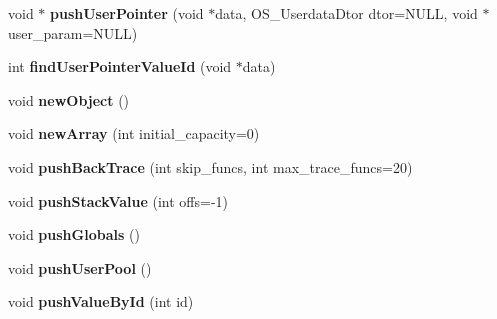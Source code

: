 \begin{DoxyCompactItemize}
\item 
void $\ast$ {\bfseries push\+User\+Pointer} (void $\ast$data, O\+S\+\_\+\+Userdata\+Dtor dtor=N\+U\+LL, void $\ast$user\+\_\+param=N\+U\+LL)\hypertarget{class_object_script_1_1_o_s_a44edc69c48bf841872ec5b1b88286495}{}\label{class_object_script_1_1_o_s_a44edc69c48bf841872ec5b1b88286495}

\item 
int {\bfseries find\+User\+Pointer\+Value\+Id} (void $\ast$data)\hypertarget{class_object_script_1_1_o_s_a84c7afc6e6d39b12dea3f9bd45ca29af}{}\label{class_object_script_1_1_o_s_a84c7afc6e6d39b12dea3f9bd45ca29af}

\item 
void {\bfseries new\+Object} ()\hypertarget{class_object_script_1_1_o_s_a535ebf443f88fd5dd02a04ae16e22f95}{}\label{class_object_script_1_1_o_s_a535ebf443f88fd5dd02a04ae16e22f95}

\item 
void {\bfseries new\+Array} (int initial\+\_\+capacity=0)\hypertarget{class_object_script_1_1_o_s_a5aacea6e919f69d67eed443d39e518f6}{}\label{class_object_script_1_1_o_s_a5aacea6e919f69d67eed443d39e518f6}

\item 
void {\bfseries push\+Back\+Trace} (int skip\+\_\+funcs, int max\+\_\+trace\+\_\+funcs=20)\hypertarget{class_object_script_1_1_o_s_ae574f8c539760a0caf1352c6bb6f2fea}{}\label{class_object_script_1_1_o_s_ae574f8c539760a0caf1352c6bb6f2fea}

\item 
void {\bfseries push\+Stack\+Value} (int offs=-\/1)\hypertarget{class_object_script_1_1_o_s_a9edea34437bb53fa3b5e9e0668e6784a}{}\label{class_object_script_1_1_o_s_a9edea34437bb53fa3b5e9e0668e6784a}

\item 
void {\bfseries push\+Globals} ()\hypertarget{class_object_script_1_1_o_s_a26d757f6ad8e8281a8c5414807bf146c}{}\label{class_object_script_1_1_o_s_a26d757f6ad8e8281a8c5414807bf146c}

\item 
void {\bfseries push\+User\+Pool} ()\hypertarget{class_object_script_1_1_o_s_a1cbe2a360395342f3feb7172d5bd7a05}{}\label{class_object_script_1_1_o_s_a1cbe2a360395342f3feb7172d5bd7a05}

\item 
void {\bfseries push\+Value\+By\+Id} (int id)\hypertarget{class_object_script_1_1_o_s_ac7c517953d20941b0a21f8f996ccf517}{}\label{class_object_script_1_1_o_s_ac7c517953d20941b0a21f8f996ccf517}


\end{DoxyCompactItemize}
